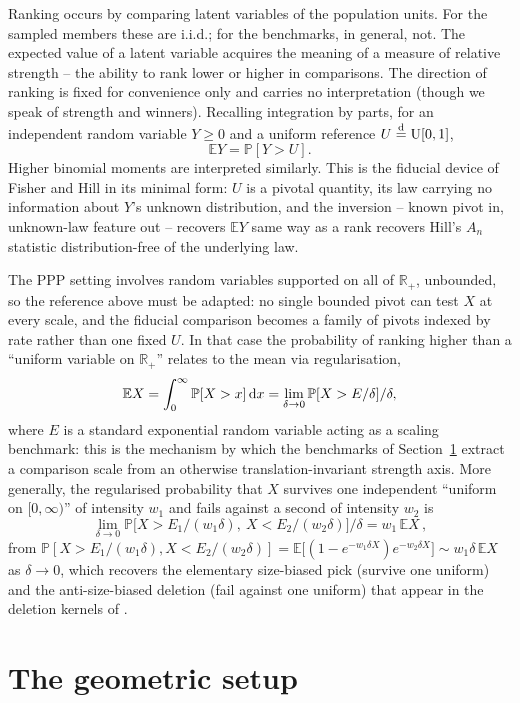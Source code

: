 \documentclass[11pt]{article}
\newcommand{\PP}{\mathbb{P}}
\newcommand{\EE}{\mathbb{E}}
\newcommand{\RR}{\mathbb{R}}
\theoremstyle{plain}
\theoremstyle{definition}
\begin{document}
Ranking occurs by comparing latent variables of the population units. For the sampled members these are i.i.d.; for the benchmarks, in general, not. The expected value of a latent variable acquires the meaning of a measure of relative strength -- the ability to rank lower or higher in comparisons. The direction of ranking is fixed for convenience only and carries no interpretation (though we speak of strength and winners). Recalling integration by parts, for an independent random variable \(Y\ge0\) and a uniform reference \(U\stackrel{\rm d}{=}\mathrm{U}[0,1]\),
\[
\EE Y = \PP[Y>U].
\]
Higher binomial moments are interpreted similarly. This is the fiducial device of Fisher and Hill \cite{Fisher,Hill} in its minimal form: \(U\) is a pivotal quantity, its law carrying no information about \(Y\)'s unknown distribution, and the inversion -- known pivot in, unknown-law feature out -- recovers \(\EE Y\) same way as a rank recovers Hill's \(A_n\) statistic distribution-free of the underlying law.

The PPP setting involves random variables supported on all of \(\RR_+\), unbounded, so the reference above must be adapted: no single bounded pivot can test \(X\) at every scale, and the fiducial comparison becomes a family of pivots indexed by rate rather than one fixed \(U\). In that case the probability of ranking higher than a ``uniform variable on \(\RR_+\)'' relates to the mean via regularisation,
\[
\EE X = \int_0^\infty \PP[X>x]\,{\rm d}x = \lim_{\delta\to0}\PP[X>E/\delta]/\delta,
\]
where \(E\) is a standard exponential random variable acting as a scaling benchmark: this is the mechanism by which the benchmarks of Section~\ref{sec:setup} extract a comparison scale from an otherwise translation-invariant strength axis. More generally, the regularised probability that \(X\) survives one independent ``uniform on \([0,\infty)\)'' of intensity \(w_1\) and fails against a second of intensity \(w_2\) is
\[
\lim_{\delta\to0}\PP\bigl[X>E_1/(w_1\delta),\ X<E_2/(w_2\delta)\bigr]/\delta
=w_1\,\EE X\,,
\]
from \(\PP[X>E_1/(w_1\delta),X<E_2/(w_2\delta)]=\EE\bigl[(1-e^{-w_1\delta X})e^{-w_2\delta X}\bigr]\sim w_1\delta\,\EE X\) as \(\delta\to0\), which recovers the elementary size-biased pick (survive one uniform) and the anti-size-biased deletion (fail against one uniform) that appear in the deletion kernels of \cite{GnedinHaulkPitman2010}.

\section{The geometric setup}
\label{sec:setup}
 
\end{document}
